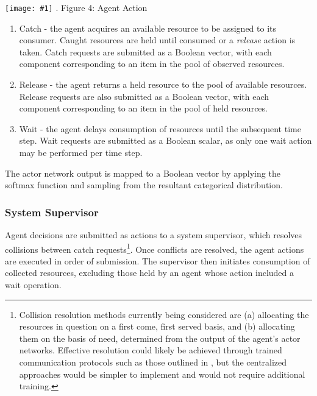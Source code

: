 \documentclass{article}
\theoremstyle{definition}
\theoremstyle{remark}
\newcommand{\addpic}[1]{\texttt{[image: \#1]}}
\begin{document}
			\addpic{figures/agent_action.png}
				.\hspace{3.5 cm}  Figure 4:  Agent Action	
			
			\begin{enumerate}
				\item Catch - the agent acquires an available resource to be assigned to its consumer. Caught resources are held until consumed or a \emph{release} action is taken. Catch requests are submitted as a Boolean vector, with each component corresponding to an item in the pool of observed resources.
				\item Release - the agent returns a held resource to the pool of available resources. Release requests are also submitted as a Boolean vector, with each component corresponding to an item in the pool of held resources.
				\item Wait - the agent delays consumption of resources until the subsequent time step. Wait requests are submitted as a Boolean scalar, as only one wait action may be performed per time step.
			\end{enumerate}
		
			The actor network output is mapped to a Boolean vector by applying the softmax function and sampling from the resultant categorical distribution.

		\subsubsection{System Supervisor}

		Agent decisions are submitted as actions to a system supervisor, which resolves collisions between catch requests\footnote{Collision resolution methods currently being considered are (a) allocating the resources in question on a first come, first served basis, and (b) allocating them on the basis of need, determined from the output of the agent's actor networks. Effective resolution could likely be achieved through trained communication protocols such as those outlined in \cite{foerster2016learning}, but the centralized approaches would be simpler to implement and would not require additional training.}. Once conflicts are resolved, the agent actions are executed in order of submission. The supervisor then initiates consumption of collected resources, excluding those held by an agent whose action included a wait operation. 
		
\end{document}
